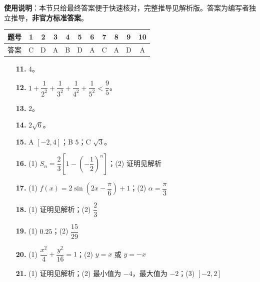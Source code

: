 
\begin{gknotice}
\textbf{使用说明}：本节只给最终答案便于快速核对，完整推导见解析版。答案为编写者独立推导，\textbf{非官方标准答案}。
\end{gknotice}

\begin{center}\begin{tabular}{ccccccccccc}
\toprule
题号 & 1 & 2 & 3 & 4 & 5 & 6 & 7 & 8 & 9 & 10 \\
\midrule
答案 & C & D & A & B & D & A & C & A & D & A \\
\bottomrule
\end{tabular}\end{center}

\begin{itemize}[leftmargin=2.6em]
  \item[\textbf{11.}] $4$。
  \item[\textbf{12.}] $1+\dfrac1{2^2}+\dfrac1{3^2}+\dfrac1{4^2}+\dfrac1{5^2}<\dfrac95$。
  \item[\textbf{13.}] $2$。
  \item[\textbf{14.}] $2\sqrt6$。
  \item[\textbf{15.}] A $[-2,4]$；B $5$；C $\sqrt3$。
\end{itemize}

\begin{itemize}[leftmargin=2.6em]
  \item[\textbf{16.}] (1) $S_n=\dfrac23\left[1-\left(-\dfrac12\right)^n\right]$；(2) 证明见解析
  \item[\textbf{17.}] (1) $f(x)=2\sin\left(2x-\dfrac\pi6\right)+1$；(2) $\alpha=\dfrac\pi3$
  \item[\textbf{18.}] (1) 证明见解析；(2) $\dfrac23$
  \item[\textbf{19.}] (1) $0.25$；(2) $\dfrac{15}{29}$
  \item[\textbf{20.}] (1) $\dfrac{x^2}4+\dfrac{y^2}{16}=1$；(2) $y=x$ 或 $y=-x$
  \item[\textbf{21.}] (1) 证明见解析；(2) 最小值为 $-4$，最大值为 $-2$；(3) $[-2,2]$
\end{itemize}
